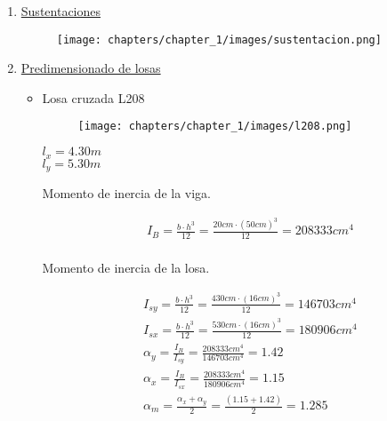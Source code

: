 \begin{enumerate}
\item \underline{Sustentaciones}\\

\begin{figure}[H]
\begin{center}
     \texttt{[image: chapters/chapter\_1/images/sustentacion.png]}
\end{center}
\end{figure}

\newpage
\item \underline{Predimensionado de losas}\\

\begin{itemize}
\item Losa cruzada L208\\

\begin{figure}[H]
\begin{center}
     \texttt{[image: chapters/chapter\_1/images/l208.png]}
\end{center}
\end{figure}

\begin{center}
$l_x=4.30m$ \\
$l_y=5.30m$ \\
\end{center}

Momento de inercia de la viga.

\begin{align*}
& I_B = \frac{b \cdot h^3}{12} = \frac{20cm \cdot (50cm)^3}{12} = 208333cm^4\\
\end{align*}

Momento de inercia de la losa.

\begin{align*}
& I_{sy} = \frac{b \cdot h^3}{12} = \frac{430cm \cdot (16cm)^3}{12} = 146703cm^4\\
& I_{sx} = \frac{b \cdot h^3}{12} = \frac{530cm \cdot (16cm)^3}{12} = 180906cm^4\\
& \alpha_y = \frac{I_B}{I_{sy}} = \frac{208333cm^4}{146703cm^4} = 1.42 \\
& \alpha_x = \frac{I_B}{I_{sx}} = \frac{208333cm^4}{180906cm^4} = 1.15 \\
& \alpha_m = \frac{\alpha_x+\alpha_y}{2} = \frac{(1.15+1.42)}{2} = 1.285
\end{align*}


\end{itemize}
\end{enumerate}
